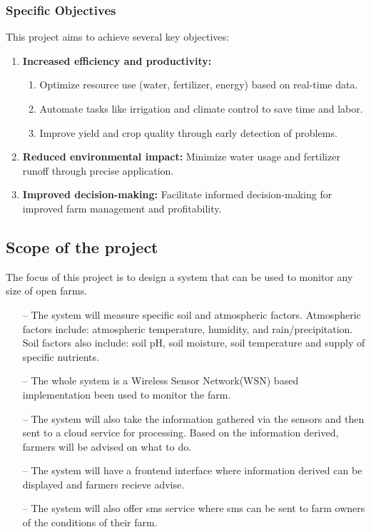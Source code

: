 \documentclass[12pt, a4paper]{article}
\begin{document}
\subsubsection{Specific Objectives}
This project aims to achieve several key objectives:\\
\begin{enumerate}
\item \textbf{Increased efficiency and productivity:}
\begin{enumerate}
 \item Optimize resource use (water, fertilizer, energy) based on real-time data.
 \item Automate tasks like irrigation and climate control to save time and labor.
 \item Improve yield and crop quality through early detection of problems.
\end{enumerate}
 
\item \textbf{Reduced environmental impact:} Minimize water usage and fertilizer runoff through precise application.\\
\item \textbf{Improved decision-making:} Facilitate informed decision-making for improved farm management and profitability.
\end{enumerate}

\newpage
\subsection{Scope of the project}
The focus of this project is to design a system that can be used to monitor any size of open farms.
\begin{itemize}
\item[--] The system will measure specific soil and atmospheric factors. Atmospheric factors include: atmospheric temperature, humidity, and rain/precipitation. Soil factors also include: soil pH, soil moisture, soil temperature and supply of specific nutrients.
\item[--] The whole system is a Wireless Sensor Network(WSN) based implementation been used to  monitor the farm.
\item[--] The system will also take the information gathered via the sensors and then sent to a cloud service for processing. Based on the information derived, farmers will be advised on what to do.
\item[--] The system will have a frontend interface where information derived can be displayed and farmers recieve advise.
\item[--] The system will also offer sms service where sms can be sent to farm owners of the conditions of their farm. 
\end{itemize}
\end{document}
